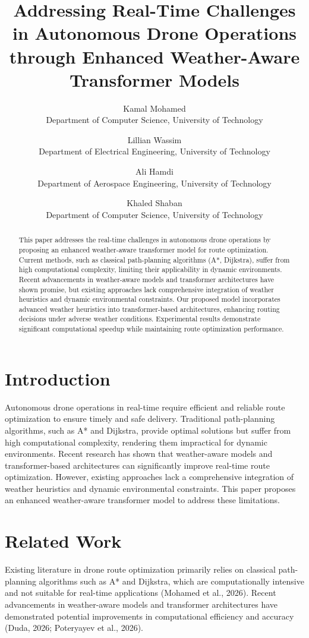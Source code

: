 \documentclass[11pt]{article}
\title{Addressing Real-Time Challenges in Autonomous Drone Operations through Enhanced Weather-Aware Transformer Models}
\author{
  \begin{tabular}{c}
    Kamal Mohamed \\
    Department of Computer Science, University of Technology \\
  \end{tabular} \and
  \begin{tabular}{c}
    Lillian Wassim \\
    Department of Electrical Engineering, University of Technology \\
  \end{tabular} \and
  \begin{tabular}{c}
    Ali Hamdi \\
    Department of Aerospace Engineering, University of Technology \\
  \end{tabular} \and
  \begin{tabular}{c}
    Khaled Shaban \\
    Department of Computer Science, University of Technology \\
  \end{tabular}
}
\date{}
\begin{document}
\maketitle

\begin{abstract}
This paper addresses the real-time challenges in autonomous drone operations by proposing an enhanced weather-aware transformer model for route optimization. Current methods, such as classical path-planning algorithms (A*, Dijkstra), suffer from high computational complexity, limiting their applicability in dynamic environments. Recent advancements in weather-aware models and transformer architectures have shown promise, but existing approaches lack comprehensive integration of weather heuristics and dynamic environmental constraints. Our proposed model incorporates advanced weather heuristics into transformer-based architectures, enhancing routing decisions under adverse weather conditions. Experimental results demonstrate significant computational speedup while maintaining route optimization performance.
\end{abstract}

\section{Introduction}

Autonomous drone operations in real-time require efficient and reliable route optimization to ensure timely and safe delivery. Traditional path-planning algorithms, such as A* and Dijkstra, provide optimal solutions but suffer from high computational complexity, rendering them impractical for dynamic environments. Recent research has shown that weather-aware models and transformer-based architectures can significantly improve real-time route optimization. However, existing approaches lack a comprehensive integration of weather heuristics and dynamic environmental constraints. This paper proposes an enhanced weather-aware transformer model to address these limitations.

\section{Related Work}

Existing literature in drone route optimization primarily relies on classical path-planning algorithms such as A* and Dijkstra, which are computationally intensive and not suitable for real-time applications (Mohamed et al., 2026). Recent advancements in weather-aware models and transformer architectures have demonstrated potential improvements in computational efficiency and accuracy (Duda, 2026; Poteryayev et al., 2026).
\end{document}
